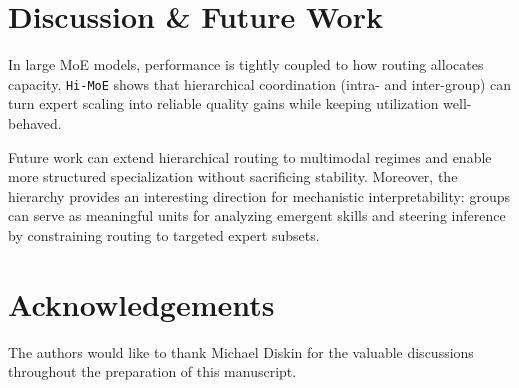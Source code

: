 \documentclass[sigconf,nonacm]{acmart}
\begin{document}
\section*{Discussion \& Future Work}
In large MoE models, performance is tightly coupled to how routing allocates capacity. \texttt{Hi-MoE} shows that hierarchical coordination (intra- and inter-group) can turn expert scaling into reliable quality gains while keeping utilization well-behaved.

Future work can extend hierarchical routing to multimodal regimes and enable more structured specialization without sacrificing stability. Moreover, the hierarchy provides an interesting direction for mechanistic interpretability: groups can serve as meaningful units for analyzing emergent skills and steering inference by constraining routing to targeted expert subsets. 

\section*{Acknowledgements}
The authors would like to thank Michael Diskin for the valuable discussions throughout the preparation of this manuscript.



\end{document}
